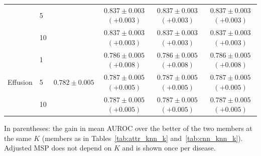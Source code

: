 \begin{table}[htbp]
\begin{tabular}{llc|ccc}
 & 5 &  & $0.837 \pm 0.003$ {\scriptsize$(+0.003)$} & $0.837 \pm 0.003$ {\scriptsize$(+0.003)$} & $\mathbf{0.837} \pm 0.003$ {\scriptsize$(+0.003)$} \\
 & 10 &  & $0.837 \pm 0.003$ {\scriptsize$(+0.003)$} & $0.837 \pm 0.003$ {\scriptsize$(+0.003)$} & $\mathbf{0.837} \pm 0.003$ {\scriptsize$(+0.003)$} \\
\midrule
\multirow{3}{*}{Effusion} & 1 & \multirow{3}{*}{$0.782 \pm 0.005$} & $0.786 \pm 0.005$ {\scriptsize$(+0.008)$} & $\mathbf{0.786} \pm 0.005$ {\scriptsize$(+0.008)$} & $0.786 \pm 0.005$ {\scriptsize$(+0.008)$} \\
 & 5 &  & $0.787 \pm 0.005$ {\scriptsize$(+0.005)$} & $0.787 \pm 0.005$ {\scriptsize$(+0.005)$} & $\mathbf{0.787} \pm 0.005$ {\scriptsize$(+0.005)$} \\
 & 10 &  & $0.787 \pm 0.005$ {\scriptsize$(+0.005)$} & $0.787 \pm 0.005$ {\scriptsize$(+0.005)$} & $\mathbf{0.787} \pm 0.005$ {\scriptsize$(+0.005)$} \\
\bottomrule
\end{tabular}
\par\smallskip\footnotesize In parentheses: the gain in mean AUROC over the better of the two members at the same $K$ (members as in Tables~\ref{tab:attr_knn_k} and~\ref{tab:cnn_knn_k}). Adjusted MSP does not depend on $K$ and is shown once per disease.
\end{table}
